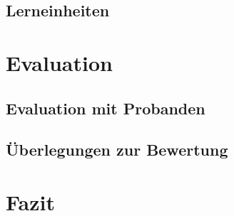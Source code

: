\documentclass[a4paper, 11pt]{article}
\begin{document}
    \subsection{Lerneinheiten}
    
    \pagebreak

    \section{Evaluation}
    \subsection{Evaluation mit Probanden}
    
    \subsection{Überlegungen zur Bewertung}
    
    \pagebreak


    \section{Fazit}
    
    \pagebreak

    
\end{document}
